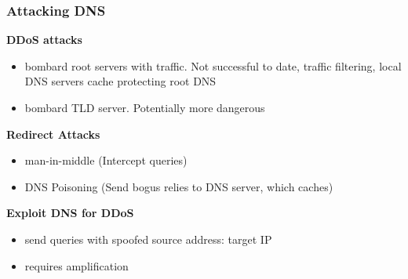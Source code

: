 \subsubsection{Attacking DNS}
\textbf{DDoS attacks}
\begin{itemize}
	\item bombard root servers with traffic. Not successful to date, traffic filtering, local DNS servers cache protecting root DNS
	\item bombard TLD server. Potentially more dangerous
\end{itemize}
\textbf{Redirect Attacks}
\begin{itemize}
	\item man-in-middle (Intercept queries)
	\item DNS Poisoning (Send bogus relies to DNS server, which caches)
\end{itemize}
\textbf{Exploit DNS for DDoS}
\begin{itemize}
	\item send queries with spoofed source address: target IP
	\item requires amplification
\end{itemize}
